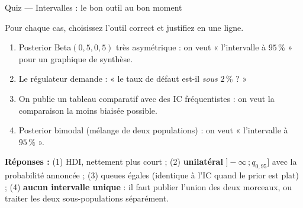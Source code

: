 \begin{frame}{Quiz --- Intervalles : le bon outil au bon moment}
\begin{qbox}
Pour chaque cas, choisissez l'outil correct et justifiez en une ligne.
\vspace{1mm}
\begin{enumerate}
  \item[(1)] Posterior Beta$(0{,}5, 0{,}5)$ très asymétrique : on veut « l'intervalle
        à $95\,\%$ » pour un graphique de synthèse.
  \item[(2)] Le régulateur demande : « le taux de défaut est-il \emph{sous} $2\,\%$ ? »
  \item[(3)] On publie un tableau comparatif avec des IC fréquentistes :
        on veut la comparaison la moins biaisée possible.
  \item[(4)] Posterior bimodal (mélange de deux populations) : on veut
        « l'intervalle à $95\,\%$ ».
\end{enumerate}
\vspace{1mm}
\textbf{Réponses :} (1) HDI, nettement plus court ; (2) \textbf{unilatéral}
$]-\infty\,;q_{0{,}95}]$ avec la probabilité annoncée ; (3) queues égales
(identique à l'IC quand le prior est plat) ; (4) \textbf{aucun intervalle unique} :
il faut publier l'union des deux morceaux, ou traiter les deux sous-populations
séparément.
\end{qbox}
\end{frame}

